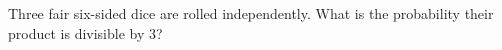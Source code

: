 Three fair six-sided dice are rolled independently. What is the probability their product is divisible by 3?
